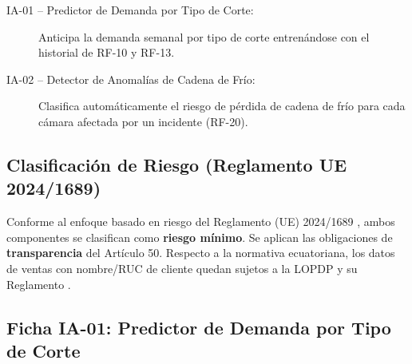 \documentclass[11pt,a4paper]{article}
\begin{document}
\begin{description}
  \item[IA-01 -- Predictor de Demanda por Tipo de Corte:] Anticipa la demanda semanal por tipo de corte entrenándose con el historial de RF-10 y RF-13.
  \item[IA-02 -- Detector de Anomalías de Cadena de Frío:] Clasifica automáticamente el riesgo de pérdida de cadena de frío para cada cámara afectada por un incidente (RF-20).
\end{description}

\subsection{Clasificación de Riesgo (Reglamento UE 2024/1689)}

Conforme al enfoque basado en riesgo del Reglamento (UE) 2024/1689 \cite{euai2024}, ambos componentes se clasifican como \textbf{riesgo mínimo}. Se aplican las obligaciones de \textbf{transparencia} del Artículo 50. Respecto a la normativa ecuatoriana, los datos de ventas con nombre/RUC de cliente quedan sujetos a la LOPDP \cite{lopdp2021} y su Reglamento \cite{lopdp_reg2023}.

\subsection{Ficha IA-01: Predictor de Demanda por Tipo de Corte}
\end{document}
